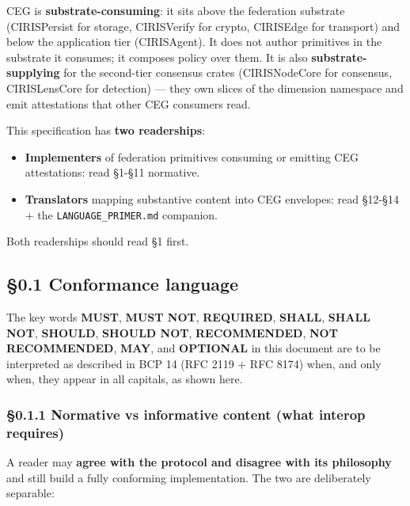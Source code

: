 \documentclass[11pt]{article}
\begin{document}
CEG is \textbf{substrate-consuming}: it sits above the federation substrate (CIRISPersist for storage, CIRISVerify for crypto, CIRISEdge for transport) and below the application tier (CIRISAgent). It does not author primitives in the substrate it consumes; it composes policy over them. It is also \textbf{substrate-supplying} for the second-tier consensus crates (CIRISNodeCore for consensus, CIRISLensCore for detection) — they own slices of the dimension namespace and emit attestations that other CEG consumers read.


This specification has \textbf{two readerships}:

\begin{itemize}\setlength\itemsep{0pt}
\item \textbf{Implementers} of federation primitives consuming or emitting CEG attestations: read §1-§11 normative.
\item \textbf{Translators} mapping substantive content into CEG envelopes: read §12-§14 + the \texttt{LANGUAGE\_PRIMER.md} companion.
\end{itemize}


Both readerships should read §1 first.



\subsection*{§0.1 Conformance language}


The key words \textbf{MUST}, \textbf{MUST NOT}, \textbf{REQUIRED}, \textbf{SHALL}, \textbf{SHALL NOT}, \textbf{SHOULD}, \textbf{SHOULD NOT}, \textbf{RECOMMENDED}, \textbf{NOT RECOMMENDED}, \textbf{MAY}, and \textbf{OPTIONAL} in this document are to be interpreted as described in BCP 14 (RFC 2119 + RFC 8174) when, and only when, they appear in all capitals, as shown here.


\subsubsection*{§0.1.1 Normative vs informative content (what interop requires)}


A reader may \textbf{agree with the protocol and disagree with its philosophy} and still build a fully conforming implementation. The two are deliberately separable:
\end{document}
